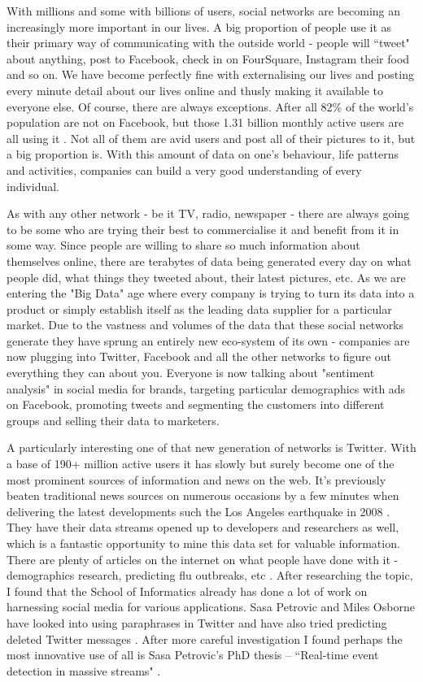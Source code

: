 \documentclass[minf,twoside,singlespacing,parskip,frontabs]{infthesis}
\begin{document}
With millions and some with billions of users, social networks are becoming an increasingly more important in our lives. A big proportion of people use it as their primary way of communicating with the outside world - people will ``tweet" about anything, post to Facebook, check in on FourSquare, Instagram their food and so on. We have become perfectly fine with externalising our lives and posting every minute detail about our lives online and thusly making it available to everyone else. 
Of course, there are always exceptions. After all 82\% of the world's population are not on Facebook, but those 1.31 billion monthly active users are all using it \cite{FBStats}. Not all of them are avid users and post all of their pictures to it, but a big proportion is. With this amount of data on one's behaviour, life patterns and activities, companies can build a very good understanding of every individual. 


As with any other network - be it TV, radio, newspaper - there are always going to be some who are trying their best to commercialise it and benefit from it in some way. Since people are willing to share so much information about themselves online, there are terabytes of data being generated every day on what people did, what things they tweeted about, their latest pictures, etc. As we are entering the "Big Data" age where every company is trying to turn its data into a product or simply establish itself as the leading data supplier for a particular market. Due to the vastness and volumes of the data that these social networks generate they have sprung an entirely new eco-system of its own - companies are now plugging into Twitter, Facebook and all the other networks to figure out everything they can about you. Everyone is now talking about "sentiment analysis" in social media for brands, targeting particular demographics with ads on Facebook, promoting tweets and segmenting the customers into different groups and selling their data to marketers.


A particularly interesting one of that new generation of networks is Twitter. With a base of 190+ million active users \cite{TwitStat} it has slowly but surely become one of the most prominent sources of information and news on the web. It's previously beaten traditional news sources on numerous occasions by a few minutes when delivering the latest developments such the Los Angeles earthquake in 2008 \cite{TwitterNewsWire}. They have their data streams opened up to developers and researchers as well, which is a fantastic opportunity to mine this data set for valuable information. There are plenty of articles on the internet on what people have done with it - demographics research, predicting flu outbreaks, etc \cite{TwitterResearch}.  After researching the topic, I found that the School of Informatics already has done a lot of work on harnessing social media for various applications. Sasa Petrovic and Miles Osborne have looked into using paraphrases in Twitter \cite{Miles1} and have also tried predicting deleted Twitter messages \cite{Miles2}. After more careful investigation I found perhaps the most innovative use of all is Sasa Petrovic's PhD thesis  -- ``Real-time event detection in massive streams" \cite{Petrovic2012}.
\end{document}
